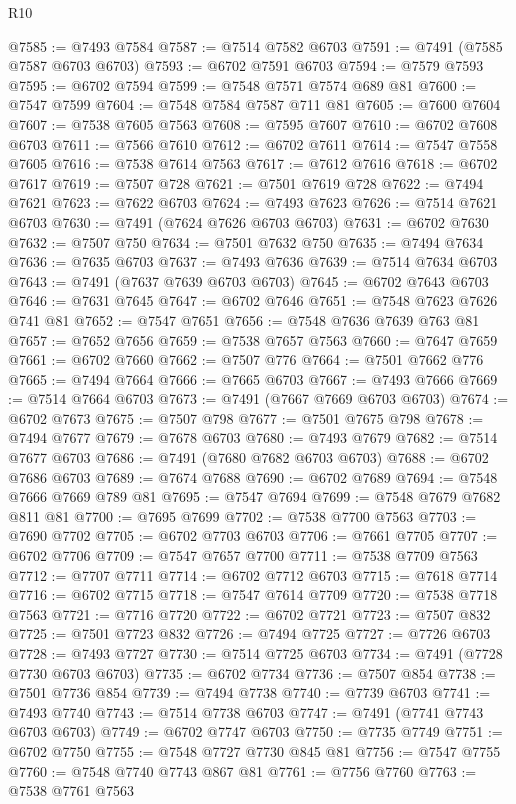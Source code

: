 \begin{lexlean}{R10}
\begin{coremodule}
@7585 := @7493 @7584
@7587 := @7514 @7582 @6703
@7591 := @7491 (@7585 @7587 @6703 @6703)
@7593 := @6702 @7591 @6703
@7594 := @7579 @7593
@7595 := @6702 @7594
@7599 := @7548 @7571 @7574 @689 @81
@7600 := @7547 @7599
@7604 := @7548 @7584 @7587 @711 @81
@7605 := @7600 @7604
@7607 := @7538 @7605 @7563
@7608 := @7595 @7607
@7610 := @6702 @7608 @6703
@7611 := @7566 @7610
@7612 := @6702 @7611
@7614 := @7547 @7558 @7605
@7616 := @7538 @7614 @7563
@7617 := @7612 @7616
@7618 := @6702 @7617
@7619 := @7507 @728
@7621 := @7501 @7619 @728
@7622 := @7494 @7621
@7623 := @7622 @6703
@7624 := @7493 @7623
@7626 := @7514 @7621 @6703
@7630 := @7491 (@7624 @7626 @6703 @6703)
@7631 := @6702 @7630
@7632 := @7507 @750
@7634 := @7501 @7632 @750
@7635 := @7494 @7634
@7636 := @7635 @6703
@7637 := @7493 @7636
@7639 := @7514 @7634 @6703
@7643 := @7491 (@7637 @7639 @6703 @6703)
@7645 := @6702 @7643 @6703
@7646 := @7631 @7645
@7647 := @6702 @7646
@7651 := @7548 @7623 @7626 @741 @81
@7652 := @7547 @7651
@7656 := @7548 @7636 @7639 @763 @81
@7657 := @7652 @7656
@7659 := @7538 @7657 @7563
@7660 := @7647 @7659
@7661 := @6702 @7660
@7662 := @7507 @776
@7664 := @7501 @7662 @776
@7665 := @7494 @7664
@7666 := @7665 @6703
@7667 := @7493 @7666
@7669 := @7514 @7664 @6703
@7673 := @7491 (@7667 @7669 @6703 @6703)
@7674 := @6702 @7673
@7675 := @7507 @798
@7677 := @7501 @7675 @798
@7678 := @7494 @7677
@7679 := @7678 @6703
@7680 := @7493 @7679
@7682 := @7514 @7677 @6703
@7686 := @7491 (@7680 @7682 @6703 @6703)
@7688 := @6702 @7686 @6703
@7689 := @7674 @7688
@7690 := @6702 @7689
@7694 := @7548 @7666 @7669 @789 @81
@7695 := @7547 @7694
@7699 := @7548 @7679 @7682 @811 @81
@7700 := @7695 @7699
@7702 := @7538 @7700 @7563
@7703 := @7690 @7702
@7705 := @6702 @7703 @6703
@7706 := @7661 @7705
@7707 := @6702 @7706
@7709 := @7547 @7657 @7700
@7711 := @7538 @7709 @7563
@7712 := @7707 @7711
@7714 := @6702 @7712 @6703
@7715 := @7618 @7714
@7716 := @6702 @7715
@7718 := @7547 @7614 @7709
@7720 := @7538 @7718 @7563
@7721 := @7716 @7720
@7722 := @6702 @7721
@7723 := @7507 @832
@7725 := @7501 @7723 @832
@7726 := @7494 @7725
@7727 := @7726 @6703
@7728 := @7493 @7727
@7730 := @7514 @7725 @6703
@7734 := @7491 (@7728 @7730 @6703 @6703)
@7735 := @6702 @7734
@7736 := @7507 @854
@7738 := @7501 @7736 @854
@7739 := @7494 @7738
@7740 := @7739 @6703
@7741 := @7493 @7740
@7743 := @7514 @7738 @6703
@7747 := @7491 (@7741 @7743 @6703 @6703)
@7749 := @6702 @7747 @6703
@7750 := @7735 @7749
@7751 := @6702 @7750
@7755 := @7548 @7727 @7730 @845 @81
@7756 := @7547 @7755
@7760 := @7548 @7740 @7743 @867 @81
@7761 := @7756 @7760
@7763 := @7538 @7761 @7563

\end{coremodule}
\end{lexlean}

